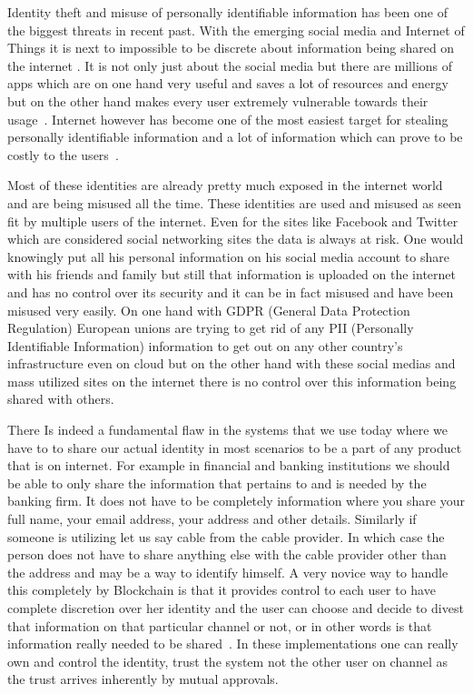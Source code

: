 Identity theft and misuse of personally identifiable information has
been one of the biggest threats in recent past. With the emerging
social media and Internet of Things it is next to impossible to be
discrete about information being shared on the internet
\cite{reuters20}. It is not only just about the social media but there
are millions of apps which are on one hand very useful and saves a lot
of resources and energy but on the other hand makes every user
extremely vulnerable towards their usage~\cite{statista21}. Internet
however has become one of the most easiest target for stealing
personally identifiable information and a lot of information which can
prove to be costly to the users~\cite{hedayati22}.

Most of these identities are already pretty much exposed in the
internet world and are being misused all the time. These identities
are used and misused as seen fit by multiple users of the internet.
Even for the sites like Facebook and Twitter which are considered
social networking sites the data is always at risk. One would
knowingly put all his personal information on his social media account
to share with his friends and family but still that information is
uploaded on the internet and has no control over its security and it
can be in fact misused and have been misused very easily. On one hand
with GDPR (General Data Protection Regulation) European unions
are trying to get rid of any PII (Personally Identifiable
  Information) information to get out on any other country's
infrastructure even on cloud but on the other hand with these social
medias and mass utilized sites on the internet there is no control over
this information being shared with others.


There Is indeed a fundamental flaw in the systems that we use today
where we have to to share our actual identity in most scenarios to be
a part of any product that is on internet. For example in financial
and banking institutions we should be able to only share the
information that pertains to and is needed by the banking firm. It
does not have to be completely information where you share your full
name, your email address, your address and other details. Similarly if
someone is utilizing let us say cable from the cable provider. In which
case the person does not have to share anything else with the cable 
provider other than the address and may be a way to identify himself.
A very novice way to handle this completely by Blockchain is 
that it provides control to each user to have 
complete discretion over her identity and
the user can choose and decide to divest that information on that
particular channel or not, or in other words is that information
really needed to be shared~\cite{alex23}. In these implementations one
can really own and control the identity, trust the system not the
other user on channel as the trust arrives inherently by mutual
approvals.


